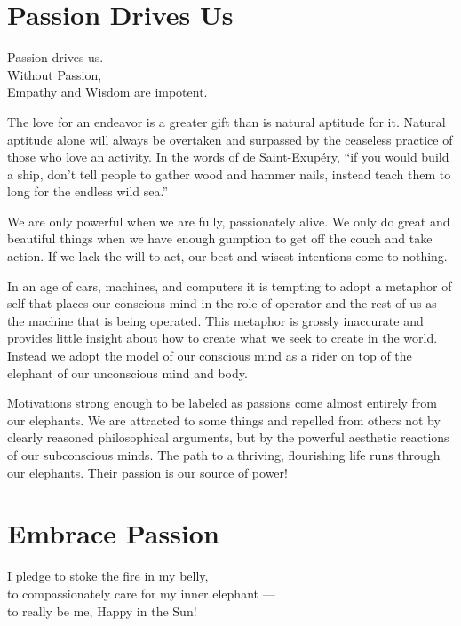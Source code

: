 \documentclass[ebook,12pt,openany,twoside]{memoir}
\newcommand{\tab}{\hspace*{2em}}
\newcommand{\imagefacingchapter}[1]{
  \cleartoverso
  \clearpage \null
  \thispagestyle{cleared}
  \AddToShipoutPictureBG*{%
    \AtStockLowerLeft{%
      \texttt{[image: \#1]}
    }
  }
  \clearpage
}
\begin{document}
\imagefacingchapter{images/PassionDrives}
\chapter{Passion Drives Us}
\setlength\epigraphwidth{2.8in}
\epigraph{
  Passion drives us.\\
  Without Passion,\\
  \tab Empathy and Wisdom are impotent.
}{}

\noindent The love for an endeavor is a greater gift than is natural aptitude for it.
Natural aptitude alone will always be overtaken and surpassed by the ceaseless
practice of those who love an activity. In the words of de Saint-Exup\'{e}ry,
``if you would build a ship, don't tell people to gather wood and hammer nails,
instead teach them to long for the endless wild sea.''

We are only powerful when we are fully, passionately alive. We only do great
and beautiful things when we have enough gumption to get off the couch and take
action. If we lack the will to act, our best and wisest intentions come to nothing.

In an age of cars, machines, and computers it is tempting to adopt a
metaphor of self that places our conscious mind in the role of operator and the
rest of us as the machine that is being operated. This metaphor is grossly
inaccurate and provides little insight about how to create what we seek to
create in the world. Instead we adopt the model of our conscious mind as a
rider on top of the elephant of our unconscious mind and body.

Motivations strong enough to be labeled as passions come almost entirely from
our elephants. We are attracted to some things and repelled from others not by
clearly reasoned philosophical arguments, but by the powerful aesthetic
reactions of our subconscious minds. The path to a thriving, flourishing life
runs through our elephants.  Their passion is our source of power!




\imagefacingchapter{images/EmbracePassion}
\chapter{Embrace Passion}
\setlength\epigraphwidth{3.4in}
\epigraph{
  I pledge to stoke the fire in my belly,\\
  to compassionately care for my inner elephant ---\\
  to really be me, Happy in the Sun!
}{}
\end{document}
